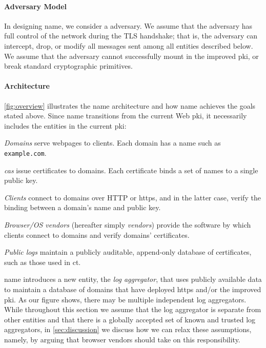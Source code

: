 \paragraph{Adversary Model}

In designing \ac{name}, we consider a  adversary. 
We assume that the adversary has full
control of the network during the TLS handshake; that is, the adversary can
intercept, drop, or modify all messages sent among all entities described
below. We assume that the adversary cannot successfully mount  in the improved
\ac{pki}, or break standard cryptographic primitives.

\paragraph{Architecture}

\autoref{fig:overview} illustrates the \ac{name} architecture and how \ac{name}
achieves the goals stated above. Since \ac{name} transitions from the current
Web \ac{pki}, it necessarily includes the entities in the current \ac{pki}:
\begin{compactitem}
\item \emph{Domains} serve webpages to clients. Each domain has a name such as
  \texttt{example.com}.
\item \emph{\acp{ca}} issue certificates to domains. Each certificate binds a
  set of names to a single public key.
\item \emph{Clients} connect to domains over HTTP or \ac{https}, and in the
  latter case, verify the binding between a domain's name and public key.
\item \emph{Browser/OS vendors} (hereafter simply \emph{vendors}) provide the
  software by which clients connect to domains and verify domains' certificates.
\item \emph{Public logs} maintain a publicly auditable, append-only database of
  certificates, such as those used in \ac{ct}.
\end{compactitem}
\ac{name} introduces a new entity, the \emph{log aggregator}, that uses publicly
available data to maintain a database of domains that have deployed \ac{https}
and/or the improved \ac{pki}. As our figure shows, there may be multiple
independent log aggregators. While throughout this section we assume that the
log aggregator is separate from other entities and that there is a globally
accepted set of known and trusted log aggregators, in \autoref{sec:discussion}
we discuss how we can relax these assumptions, namely, by arguing that browser
vendors should take on this responsibility.

